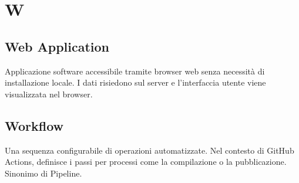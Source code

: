 \documentclass[a4paper, 11pt, oneside]{scrartcl} %
\begin{document}

\section*{W}


\subsection*{Web Application}


Applicazione software accessibile tramite browser web senza necessità di installazione locale. I dati risiedono sul server e l'interfaccia utente viene visualizzata nel browser.

\vspace{0.5cm}

\subsection*{Workflow}


Una sequenza configurabile di operazioni automatizzate. Nel contesto di GitHub Actions, definisce i passi per processi come la compilazione o la pubblicazione. Sinonimo di Pipeline.

\vspace{0.5cm}
\end{document}
